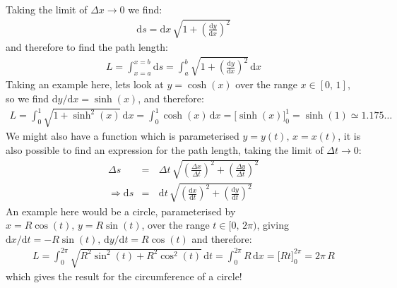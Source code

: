 \documentclass[letterpaper,10pt,english]{jupyterBook}
\begin{document}
\sphinxAtStartPar
Taking the limit of \(\Delta x\rightarrow 0\) we find:
\begin{equation*}
\begin{split}\mathrm{d}s = \mathrm{d}x\, \sqrt{1 + \left(\frac{\mathrm{d}y}{\mathrm{d}x}\right)^2}\end{split}
\end{equation*}
\sphinxAtStartPar
and therefore to find the path length:
\begin{equation*}
\begin{split}L = \int_{x=a}^{x=b} \mathrm{d}s = \int_a^b \sqrt{1 + \left(\frac{\mathrm{d}y}{\mathrm{d}x}\right)^2}\,\mathrm{d}x\end{split}
\end{equation*}
\sphinxAtStartPar
Taking an example here, lets look at \(y = \cosh(x)\) over the range \(x \in [0,\,1]\), so we find \(\mathrm{d}y/\mathrm{d}x = \sinh(x)\), and therefore:
\begin{equation*}
\begin{split}L = \int_0^1 \sqrt{1 + \sinh^2(x)}\,\mathrm{d}x = \int_0^1 \cosh(x)\,\mathrm{d}x = \Big[ \sinh(x) \Big]_0^1 = \sinh(1) \simeq 1.175\dots\end{split}
\end{equation*}
\sphinxAtStartPar
We might also have a function which is parameterised \(y = y(t),\, x=x(t)\), it is also possible to find an expression for the path length, taking the limit of
\(\Delta t \rightarrow 0\):
\begin{equation*}
\begin{split}\Delta s &=&\, \Delta t\,\sqrt{\left(\frac{\Delta x}{\Delta t}\right)^2 + \left(\frac{\Delta y}{\Delta t}\right)^2} \\
\Rightarrow \mathrm{d}s &=&\, \mathrm{d}t\, \sqrt{\left(\frac{\mathrm{d}x}{\mathrm{d}t}\right)^2 + \left(\frac{\mathrm{d}y}{\mathrm{d}t}\right)^2}\end{split}
\end{equation*}
\sphinxAtStartPar
An example here would be a circle, parameterised by \(x = R\cos(t),\, y = R\sin(t)\), over the range \(t \in [0,\, 2\pi)\), giving
\(\mathrm{d}x/\mathrm{d}t = -R\sin(t),\, \mathrm{d}y/\mathrm{d}t = R\cos(t)\) and therefore:
\begin{equation*}
\begin{split}L = \int_0^{2\pi} \sqrt{R^2\sin^2(t) + R^2\cos^2(t)}\,\mathrm{d}t = \int_0^{2\pi} R\,\mathrm{d}x = \Big[ Rt \Big]_0^{2\pi} = 2\pi\,R\end{split}
\end{equation*}
\sphinxAtStartPar
which gives the result for the circumference of a circle!
\end{document}
